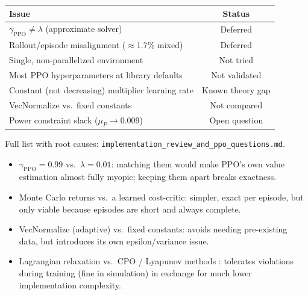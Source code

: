 \documentclass[aspectratio=169]{beamer}
\begin{document}
\begin{frame}
\begin{center}
{\scriptsize
\begin{tabular}{lc}
\toprule
Issue & Status \\
\midrule
$\gamma_{\text{PPO}}\ne\lambda$ (approximate solver) & Deferred \\
Rollout/episode misalignment ($\approx$1.7\% mixed) & Deferred \\
Single, non-parallelized environment & Not tried \\
Most PPO hyperparameters at library defaults & Not validated \\
Constant (not decreasing) multiplier learning rate & Known theory gap \\
VecNormalize vs.\ fixed constants & Not compared \\
Power constraint slack ($\mu_P\to0.009$) & Open question \\
\bottomrule
\end{tabular}}
\end{center}
\vspace{4pt}
\footnotesize Full list with root causes: \texttt{implementation\_review\_and\_ppo\_questions.md}.
\end{frame}

\begin{frame}
\begin{itemize}
  \item $\gamma_{\text{PPO}}=0.99$ vs.\ $\lambda=0.01$: matching them would make PPO's own value estimation almost fully myopic; keeping them apart breaks exactness.
  \item Monte Carlo returns vs.\ a learned cost-critic: simpler, exact per episode, but only viable because episodes are short and always complete.
  \item VecNormalize (adaptive) vs.\ fixed constants: avoids needing pre-existing data, but introduces its own epsilon/variance issue.
  \item Lagrangian relaxation vs.\ CPO \cite{achiam17} / Lyapunov methods \cite{chow18}: tolerates violations during training (fine in simulation) in exchange for much lower implementation complexity.
\end{itemize}
\end{frame}
\end{document}
